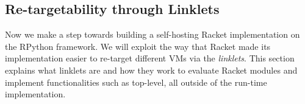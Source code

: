 \subsection{Re-targetability through Linklets}
\label{subsec:linklets}

Now we make a step towards building a self-hosting Racket
implementation on the RPython framework. We will exploit the way that
Racket made its implementation easier to re-target different VMs via
the \emph{linklets}. This section explains what linklets are and how
they work to evaluate Racket modules and implement functionalities
such as top-level, all outside of the run-time implementation.




